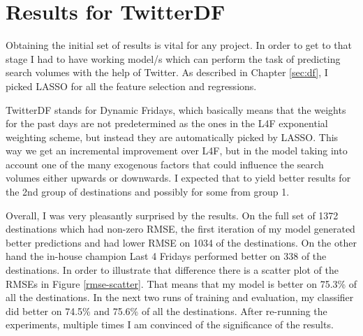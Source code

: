 \documentclass[minf,twoside,singlespacing,parskip,frontabs,notimes,11pt]{infthesis}
\begin{document}
\newpage
\section{Results for TwitterDF}
\label{TwitterDF}


Obtaining the initial set of results is vital for any project. In order to get to that stage I had to have working model/s which can perform the task of predicting search volumes with the help of Twitter. As described in Chapter \ref{sec:df}, I picked LASSO for all the feature selection and regressions. 


TwitterDF stands for Dynamic Fridays, which basically means that the weights for the past days are not predetermined as the ones in the L4F exponential weighting scheme, but instead they are automatically picked by LASSO. This way we get an incremental improvement over L4F, but in the model taking into account one of the many exogenous factors that could influence the search volumes either upwards or downwards. I expected that to yield better results for the 2nd group of destinations and possibly for some from group 1.


Overall, I was very pleasantly surprised by the results. On the full set of 1372 destinations which had non-zero RMSE, the first iteration of my model generated better predictions and had lower RMSE on 1034 of the destinations. On the other hand the in-house champion Last 4 Fridays performed better on 338 of the destinations. In order to illustrate that difference there is a scatter plot of the RMSEs in Figure \ref{rmse-scatter}. That means that my model is better on 75.3\% of all the destinations. In the next two runs of training and evaluation, my classifier did better on 74.5\% and 75.6\% of all the destinations. After re-running the experiments, multiple times I am convinced of the significance of the results. 
\end{document}
